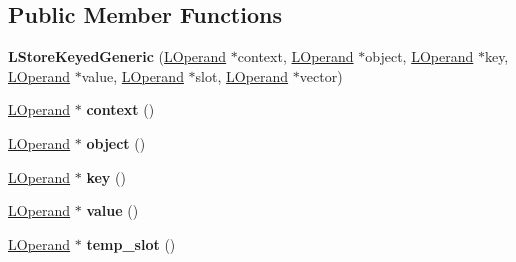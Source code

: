 \subsection*{Public Member Functions}
\begin{DoxyCompactItemize}
\item 
{\bfseries L\+Store\+Keyed\+Generic} (\hyperlink{classv8_1_1internal_1_1_l_operand}{L\+Operand} $\ast$context, \hyperlink{classv8_1_1internal_1_1_l_operand}{L\+Operand} $\ast$object, \hyperlink{classv8_1_1internal_1_1_l_operand}{L\+Operand} $\ast$key, \hyperlink{classv8_1_1internal_1_1_l_operand}{L\+Operand} $\ast$value, \hyperlink{classv8_1_1internal_1_1_l_operand}{L\+Operand} $\ast$slot, \hyperlink{classv8_1_1internal_1_1_l_operand}{L\+Operand} $\ast$vector)\hypertarget{classv8_1_1internal_1_1_l_store_keyed_generic_af091880976ae47ab5668f689b739343e}{}\label{classv8_1_1internal_1_1_l_store_keyed_generic_af091880976ae47ab5668f689b739343e}

\item 
\hyperlink{classv8_1_1internal_1_1_l_operand}{L\+Operand} $\ast$ {\bfseries context} ()\hypertarget{classv8_1_1internal_1_1_l_store_keyed_generic_a4f167d2748fbfa19937cabab260ea080}{}\label{classv8_1_1internal_1_1_l_store_keyed_generic_a4f167d2748fbfa19937cabab260ea080}

\item 
\hyperlink{classv8_1_1internal_1_1_l_operand}{L\+Operand} $\ast$ {\bfseries object} ()\hypertarget{classv8_1_1internal_1_1_l_store_keyed_generic_af1106ab73c930b73c937d138a3b68d6e}{}\label{classv8_1_1internal_1_1_l_store_keyed_generic_af1106ab73c930b73c937d138a3b68d6e}

\item 
\hyperlink{classv8_1_1internal_1_1_l_operand}{L\+Operand} $\ast$ {\bfseries key} ()\hypertarget{classv8_1_1internal_1_1_l_store_keyed_generic_a8e5ab828ddbab917cc744e7c6022259d}{}\label{classv8_1_1internal_1_1_l_store_keyed_generic_a8e5ab828ddbab917cc744e7c6022259d}

\item 
\hyperlink{classv8_1_1internal_1_1_l_operand}{L\+Operand} $\ast$ {\bfseries value} ()\hypertarget{classv8_1_1internal_1_1_l_store_keyed_generic_ae0648fd1acbfca9be9ecd39a179ebb13}{}\label{classv8_1_1internal_1_1_l_store_keyed_generic_ae0648fd1acbfca9be9ecd39a179ebb13}

\item 
\hyperlink{classv8_1_1internal_1_1_l_operand}{L\+Operand} $\ast$ {\bfseries temp\+\_\+slot} ()\hypertarget{classv8_1_1internal_1_1_l_store_keyed_generic_a2badce4286c0f26664dbddd0e2b29846}{}\label{classv8_1_1internal_1_1_l_store_keyed_generic_a2badce4286c0f26664dbddd0e2b29846}


\end{DoxyCompactItemize}
